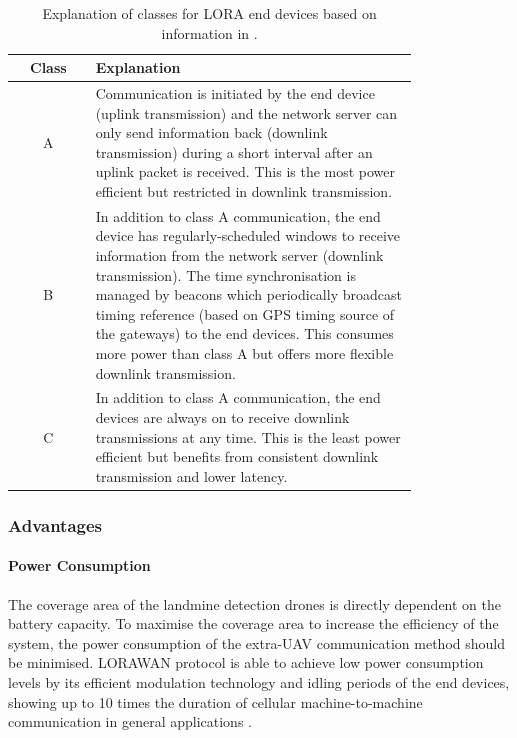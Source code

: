 \begin{table}[h!]
    \centering
    \begin{tabular}{c p{0.8\linewidth}}
    \hline
        \textbf{Class} & \textbf{Explanation} \\
    \hline
        A & Communication is initiated by the end device (uplink transmission) and the network server can only send information back (downlink transmission) during a short interval after an uplink packet is received. This is the most power efficient but restricted in downlink transmission. \\
    \hline
        B & In addition to class A communication, the end device has regularly-scheduled windows to receive information from the network server (downlink transmission). The time synchronisation is managed by beacons which periodically broadcast timing reference (based on GPS timing source of the gateways) to the end devices. This consumes more power than class A but offers more flexible downlink transmission. \\
    \hline
        C & In addition to class A communication, the end devices are always on to receive downlink transmissions at any time. This is the least power efficient but benefits from consistent downlink transmission and lower latency. \\
    \hline
    \end{tabular}
    \caption[Explanation of Classes for LoRa End Devices]
    {Explanation of classes for \gls{LORA} end devices based on information in \cite{semtech2024lora}.}
    \label{tab:euc_loraclasses}
\end{table}

\subsubsection{Advantages}

\paragraph{Power Consumption} The coverage area of the landmine detection drones is directly dependent on the battery capacity. To maximise the coverage area to increase the efficiency of the system, the power consumption of the extra-\gls{UAV} communication method should be minimised. \gls{LORAWAN} protocol is able to achieve low power consumption levels by its efficient modulation technology and idling periods of the end devices, showing up to 10 times the duration of cellular machine-to-machine communication in general applications \cite{semtech2024lora}. 

